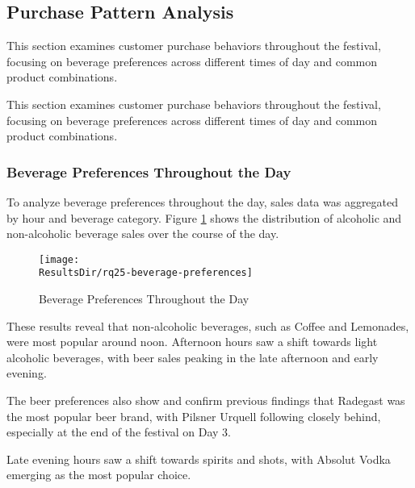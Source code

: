 
\subsection{Purchase Pattern Analysis}
\label{subsec:analysis-customer-purchase-pattern}

This section examines customer purchase behaviors throughout the festival, focusing on beverage preferences across different times of day and common product combinations.

This section examines customer purchase behaviors throughout the festival, focusing on beverage preferences across different times of day and common product combinations.


\subsubsection{Beverage Preferences Throughout the Day}
\label{subsubsec:analysis-beverage-preferences}


To analyze beverage preferences throughout the day, sales data was aggregated by hour and beverage category.
Figure \ref{fig:beverage-preferences} shows the distribution of alcoholic and non-alcoholic beverage sales over the course of the day.

\begin{figure}[H]
	\centering
	\texttt{[image: \\ResultsDir/rq25-beverage-preferences]}
	\caption{Beverage Preferences Throughout the Day}
	\label{fig:beverage-preferences}
	\source
\end{figure}

These results reveal that non-alcoholic beverages, such as Coffee and Lemonades, were most popular around noon.
Afternoon hours saw a shift towards light alcoholic beverages, with beer sales peaking in the late afternoon and early evening.

The beer preferences also show and confirm previous findings that Radegast was the most popular beer brand, with Pilsner Urquell following closely behind, especially at the end of the festival on Day 3.

Late evening hours saw a shift towards spirits and shots, with Absolut Vodka emerging as the most popular choice.


